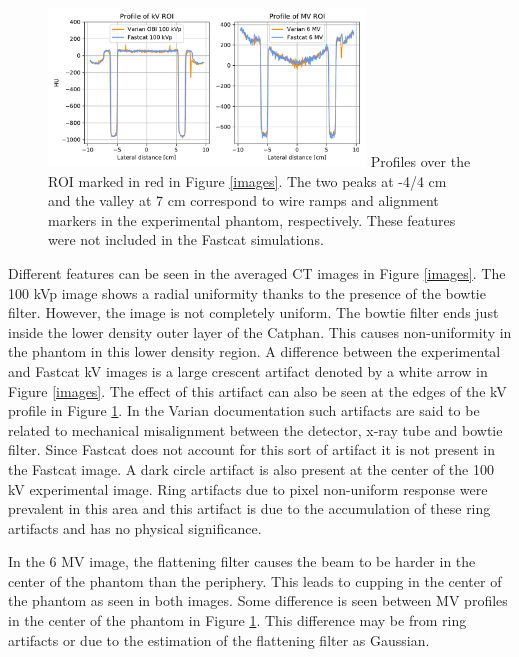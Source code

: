 \begin{figure}[ht!]
  \begin{center}
  \includegraphics[width=0.75\textwidth, clip]{figures/one_profile.pdf}
  {Profiles over the ROI marked in red in Figure \ref{images}. The two peaks at -4/4 cm and the valley at 7 cm correspond to wire ramps and alignment markers in the experimental phantom, respectively. These features were not included in the Fastcat simulations.
  \label{profile} 
    }  %
    \end{center}
\end{figure}

Different features can be seen in the averaged CT images in Figure \ref{images}. The 100 kVp image shows a radial uniformity thanks to the presence of the bowtie filter. However, the image is not completely uniform. The bowtie filter ends just inside the lower density outer layer of the Catphan. This causes non-uniformity in the phantom in this lower density region. A difference between the experimental and Fastcat kV images is a large crescent artifact denoted by a white arrow in Figure \ref{images}. The effect of this artifact can also be seen at the edges of the kV profile in Figure \ref{profile}. In the Varian documentation such artifacts are said to be related to mechanical misalignment between the detector, x-ray tube and bowtie filter. Since Fastcat does not account for this sort of artifact it is not present in the Fastcat image. A dark circle artifact is also present at the center of the 100 kV experimental image. Ring artifacts due to pixel non-uniform response were prevalent in this area and this artifact is due to the accumulation of these ring artifacts and has no physical significance.

In the 6 MV image, the flattening filter causes the beam to be harder in the center of the phantom than the periphery. This leads to cupping in the center of the phantom as seen in both images. Some difference is seen between MV profiles in the center of the phantom in Figure \ref{profile}. This difference may be from ring artifacts or due to the estimation of the flattening filter as Gaussian. 

